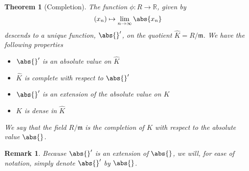 \documentclass{article}
\newtheorem{theorem}{Theorem}[section]
\newtheorem{remark}{Remark}[section]
\newcommand{\mfrak}[1]{\mathfrak{#1}}
\newcommand{\mbb}[1]{\mathbb{#1}}
\begin{document}
\begin{theorem}[Completion]
    The function $\phi : R \to \mbb R$, given by
    $$(x_n) \mapsto \lim_{n \to \infty} \abs{x_n}$$
    descends to a unique function, $\abs{}'$, on the quotient $\hat K = R / \mfrak m$. We have the following properties
    \begin{itemize}
        \item $\abs{}'$ is an absolute value on $\hat K$
        \item $\hat K$ is complete with respect to $\abs{}'$
        \item $\abs {}'$ is an extension of the absolute value on $K$
        \item $K$ is dense in $\hat K$
    \end{itemize}
    We say that the field $R / \mfrak m$ is the completion of $K$ with respect to the absolute value $\abs{}$.
\end{theorem}
\begin{remark}
    Because $\abs{}'$ is an extension of $\abs{}$, we will, for ease of notation, simply denote $\abs{}'$ by $\abs{}$.
\end{remark}
\end{document}
